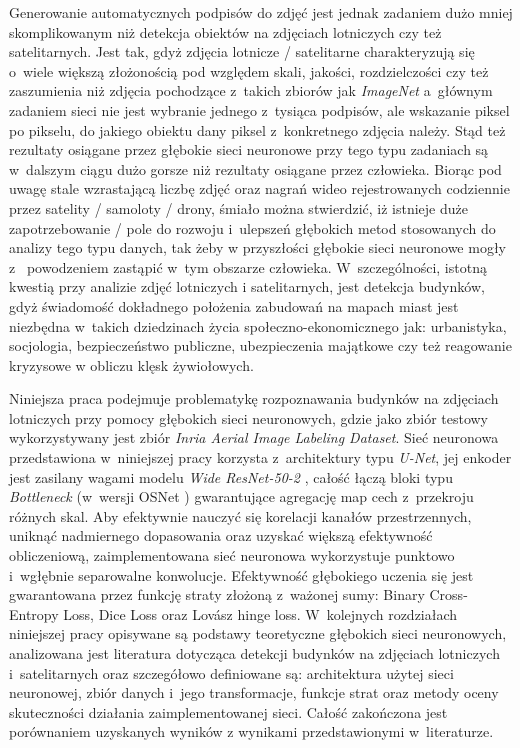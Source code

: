 Generowanie automatycznych podpisów do zdjęć jest jednak zadaniem dużo mniej skomplikowanym niż detekcja obiektów na zdjęciach lotniczych czy też satelitarnych. Jest tak, gdyż zdjęcia lotnicze / satelitarne charakteryzują się o~wiele większą złożonością pod względem skali, jakości, rozdzielczości czy też zaszumienia niż zdjęcia pochodzące z~takich zbiorów jak \emph{ImageNet} a~głównym zadaniem sieci nie jest wybranie jednego z~tysiąca podpisów, ale wskazanie piksel po pikselu, do jakiego obiektu dany piksel z~konkretnego zdjęcia należy. Stąd też rezultaty osiągane przez głębokie sieci neuronowe przy tego typu zadaniach są w~dalszym ciągu dużo gorsze niż rezultaty osiągane przez człowieka. Biorąc pod uwagę stale wzrastającą liczbę zdjęć oraz nagrań wideo rejestrowanych codziennie przez satelity / samoloty / drony, śmiało można stwierdzić, iż istnieje duże zapotrzebowanie / pole do rozwoju i~ulepszeń głębokich metod stosowanych do analizy tego typu danych, tak żeby w przyszłości głębokie sieci neuronowe mogły z~ powodzeniem zastąpić w~tym obszarze człowieka. W~szczególności, istotną kwestią przy analizie zdjęć lotniczych i satelitarnych, jest detekcja budynków, gdyż świadomość dokładnego położenia zabudowań na mapach miast jest niezbędna w~takich dziedzinach życia społeczno-ekonomicznego jak: urbanistyka, socjologia, bezpieczeństwo publiczne, ubezpieczenia majątkowe czy też reagowanie kryzysowe w obliczu klęsk żywiołowych.

Niniejsza praca podejmuje problematykę rozpoznawania budynków na zdjęciach lotniczych przy pomocy głębokich sieci neuronowych, gdzie jako zbiór testowy wykorzystywany jest zbiór \emph{Inria Aerial Image Labeling Dataset}. Sieć neuronowa przedstawiona w~niniejszej pracy korzysta z~architektury typu \emph{U-Net}, jej enkoder jest zasilany wagami modelu \emph{Wide ResNet-50-2} \cite{zagoruyko}, całość łączą bloki typu \emph{Bottleneck} (w~wersji OSNet \cite{zhou}) gwarantujące agregację map cech z~przekroju różnych skal. Aby efektywnie nauczyć się korelacji kanałów przestrzennych, uniknąć nadmiernego dopasowania oraz uzyskać większą efektywność obliczeniową, zaimplementowana sieć neuronowa wykorzystuje punktowo i~wgłębnie separowalne konwolucje. Efektywność głębokiego uczenia się jest gwarantowana przez funkcję straty złożoną z~ważonej sumy: Binary Cross-Entropy Loss, Dice Loss oraz Lovász hinge loss. W~kolejnych rozdziałach niniejszej pracy opisywane są podstawy teoretyczne głębokich sieci neuronowych, analizowana jest literatura dotycząca detekcji budynków na zdjęciach lotniczych i~satelitarnych oraz szczegółowo definiowane są: architektura użytej sieci neuronowej, zbiór danych i~jego transformacje, funkcje strat oraz metody oceny skuteczności działania zaimplementowanej sieci. Całość zakończona jest porównaniem uzyskanych wyników z wynikami przedstawionymi w~literaturze.
